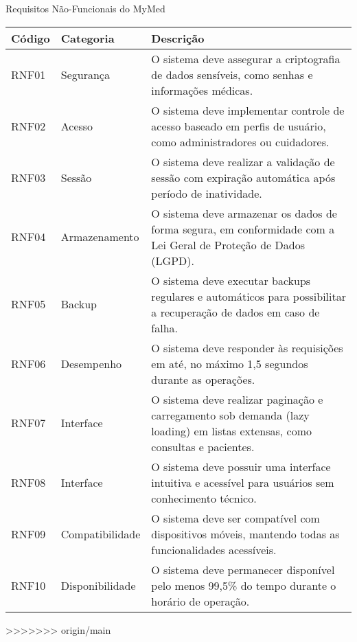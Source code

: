 \begin{quadro}
\caption{Requisitos Não-Funcionais do MyMed}
\begin{tabularx}{\textwidth}{|l|l|X|}
\hline
\textbf{Código} & \textbf{Categoria} & \textbf{Descrição} \\ \hline
RNF01 & Segurança & O sistema deve assegurar a criptografia de dados sensíveis, como senhas e informações médicas. \\ \hline
RNF02 & Acesso & O sistema deve implementar controle de acesso baseado em perfis de usuário, como administradores ou cuidadores. \\ \hline
RNF03 & Sessão & O sistema deve realizar a validação de sessão com expiração automática após período de inatividade. \\ \hline
RNF04 & Armazenamento & O sistema deve armazenar os dados de forma segura, em conformidade com a Lei Geral de Proteção de Dados (LGPD). \\ \hline
RNF05 & Backup & O sistema deve executar backups regulares e automáticos para possibilitar a recuperação de dados em caso de falha. \\ \hline
RNF06 & Desempenho & O sistema deve responder às requisições em até, no máximo 1,5 segundos durante as operações. \\ \hline
RNF07 & Interface & O sistema deve realizar paginação e carregamento sob demanda (lazy loading) em listas extensas, como consultas e pacientes. \\ \hline
RNF08 & Interface & O sistema deve possuir uma interface intuitiva e acessível para usuários sem conhecimento técnico. \\ \hline
RNF09 & Compatibilidade & O sistema deve ser compatível com dispositivos móveis, mantendo todas as funcionalidades acessíveis. \\ \hline
RNF10 & Disponibilidade & O sistema deve permanecer disponível pelo menos 99,5\% do tempo durante o horário de operação. \\ \hline
\end{tabularx}
\end{quadro}
>>>>>>> origin/main
